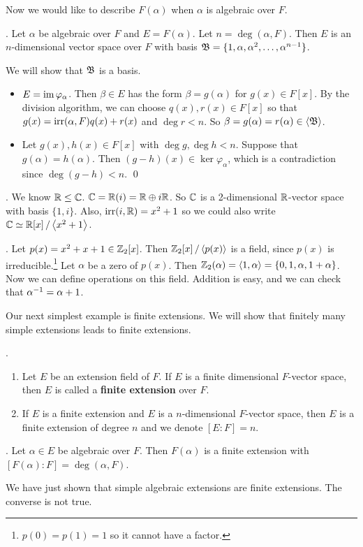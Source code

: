 Now we would like to describe \(F(\alpha)\) when \(\alpha\) is algebraic over \(F\).

\thm. Let \(\alpha\) be algebraic over \(F\) and \(E = F(\alpha)\). Let \(n = \deg(\alpha, F)\). Then \(E\) is an \(n\)-dimensional vector space over \(F\) with basis \(\mathfrak{B} = \{1, \alpha, \alpha^2, \dots, \alpha^{n-1}\}\).

\pf We will show that \(\mathfrak{B}\) is a basis.
\begin{itemize}
    \item {} \(E = \operatorname{im} \varphi_\alpha\). Then \(\beta \in E\) has the form \(\beta = g(\alpha)\) for \(g(x) \in F[x]\). By the division algorithm, we can choose \(q(x), r(x) \in F[x]\) so that \(g(x) = \mathrm{irr}(\alpha, F) q(x) + r(x)\) and \(\deg r < n\). So \(\beta = g(\alpha) = r(\alpha) \in \left\langle \mathfrak{B} \right\rangle\).
    \item {} Let \(g(x), h(x) \in F[x]\) with \(\deg g, \deg h < n\). Suppose that \(g(\alpha) = h(\alpha)\). Then \((g-h)(x) \in \ker \varphi_\alpha\), which is a contradiction since \(\deg (g-h) < n\). \qed
\end{itemize}

\pagebreak

\ex. We know \(\mathbb{R} \leq \mathbb{C}\). \(\mathbb{C} = \mathbb{R}(i) = \mathbb{R} \oplus i\mathbb{R}\). So \(\mathbb{C}\) is a 2-dimensional \(\mathbb{R}\)-vector space with basis \(\{1, i\}\). Also, \(\mathrm{irr}(i, \mathbb{R}) = x^2 + 1\) so we could also write \(\mathbb{C} \simeq \mathbb{R}[x] \operatorname{/} \left\langle x^2 + 1 \right\rangle\).

\ex. Let \(p(x) = x^2 + x + 1 \in \mathbb{Z}_2[x]\). Then \(\mathbb{Z}_2[x] \operatorname{/} \left\langle p(x) \right\rangle\) is a field, since \(p(x)\) is irreducible.\footnote{\(p(0) = p(1) = 1\) so it cannot have a factor.} Let \(\alpha\) be a zero of \(p(x)\). Then \(\mathbb{Z}_2(\alpha) = \left\langle 1, \alpha \right\rangle = \left\{0, 1, \alpha, 1 + \alpha\right\}\). Now we can define operations on this field. Addition is easy, and we can check that \(\alpha^{-1} = \alpha + 1\).

\setcounter{topic}{30}

Our next simplest example is finite extensions. We will show that finitely many simple extensions leads to finite extensions.

. 
\begin{enumerate}
    \item Let \(E\) be an extension field of \(F\). If \(E\) is a finite dimensional \(F\)-vector space, then \(E\) is called a \textbf{finite extension} over \(F\).

    \item If \(E\) is a finite extension and \(E\) is a \(n\)-dimensional \(F\)-vector space, then \(E\) is a finite extension of degree \(n\) and we denote \([E : F] = n\).
\end{enumerate}

\cor. Let \(\alpha \in E\) be algebraic over \(F\). Then \(F(\alpha)\) is a finite extension with \([F(\alpha) : F] = \deg(\alpha, F)\).

We have just shown that simple algebraic extensions are finite extensions. The converse is not true.

\smallskip
